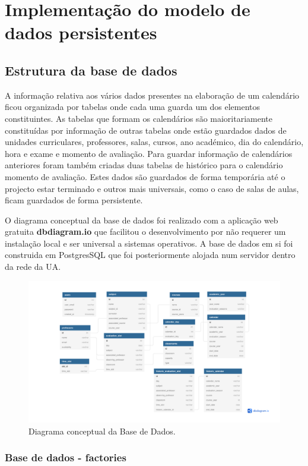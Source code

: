 \documentclass[11pt, twoside]{report}
\begin{document}
	\chapter{Implementação do modelo de dados persistentes}
	\section{Estrutura da base de dados}
	A informação relativa aos vários dados presentes na elaboração de um calendário ficou organizada por tabelas onde cada uma guarda um dos elementos constituintes.
	As tabelas que formam os calendários são maioritariamente constituídas por informação de outras tabelas onde estão guardados dados de unidades curriculares, professores, salas, cursos, ano académico, dia do calendário, hora e exame e momento de avaliação.
	Para guardar informação de calendários anteriores foram também criadas duas tabelas de histórico para o calendário momento de avaliação.
	Estes dados são guardados de forma temporária até o projecto estar terminado e outros mais universais, como o caso de salas de aulas, ficam guardados de forma persistente.
	
	O diagrama conceptual da base de dados foi realizado com a aplicação web gratuita \textbf{dbdiagram.io} que facilitou o desenvolvimento por não requerer um instalação local e ser universal a sistemas operativos.
	A base de dados em si foi construida em PostgresSQL que foi posteriormente alojada num servidor dentro da rede da UA.
	
	\begin{figure}[H]
		\centering
		\includegraphics[width=0.95\linewidth]{image/Calendario_DB}
		\caption{Diagrama conceptual da Base de Dados.}
		\label{fig:calendariodb}
	\end{figure}
	
	
	\subsection{Base de dados - factories}
\end{document}
